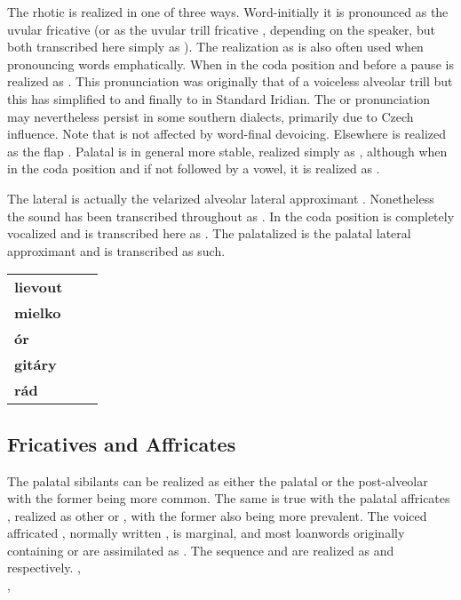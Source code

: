 The rhotic  is realized in one of three ways. Word-initially it is pronounced as the uvular fricative \nt{\textinvscr} (or as the uvular trill fricative \nt{\textraising{\textscr}}, depending on the speaker, but both transcribed here simply as \nt{\rrr}). The realization as \nt{\rrr} is also often used when pronouncing words emphatically. When in the coda position and before a pause  is realized as \bt{\textctz}. This pronunciation was originally that of a voiceless alveolar trill  but this has simplified to  and finally to \nt{\textctz} in Standard Iridian. The  or  pronunciation may nevertheless persist in some southern dialects, primarily due to Czech influence. Note that \nt{\textctz} is not affected by word-final devoicing. Elsewhere  is realized as the flap . Palatal  is in general more stable, realized simply as , although when in the coda position and if not followed by a vowel, it is realized as \nt{\textctz}.

The lateral  is actually the velarized alveolar lateral approximant \nt{\textltilde}. Nonetheless the sound has been transcribed throughout as . In the coda position  is completely vocalized and is transcribed here as . The palatalized  is the palatal lateral approximant  and is transcribed as such.

\ex
	{\small
	\begin{tabularx}{0.8\textwidth}{>{\bfseries}YYY}
		lievout		&  	& \\
		mielko	 	& 		& \\
		\'or		& 				& \\
		git\'ary	& 		& \\
		r\'ad		& 			& \\
	\end{tabularx}}
\xe

\subsection{Fricatives and Affricates}
The palatal sibilants  can be realized as either the palatal  or the post-alveolar  with the former being more common. The same is true with the palatal affricates , realized as other  or , with the former also being more prevalent. The voiced affricated , normally written , is marginal, and most loanwords originally containing  or  are assimilated as \nt{\zz}. The sequence  and  are realized as  and  respectively.  
\ex
{}, \\
\xe
\ex
{}, \\
\xe

